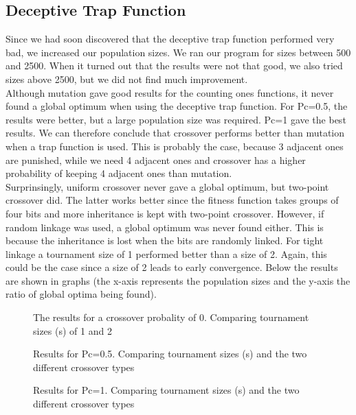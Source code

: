 \documentclass[10pt,a4paper,onecolumn]{article}
\begin{document}
\subsection{Deceptive Trap Function}
Since we had soon discovered that the deceptive trap function performed very bad, we increased our population sizes. We ran our program for sizes between 500 and 2500. When it turned out that the results were not that good, we also tried sizes above 2500, but we did not find much improvement. \\
Although mutation gave good results for the counting ones functions, it never found a global optimum when using the deceptive trap function. For Pc=0.5, the results were better, but a large population size was required. Pc=1 gave the best results. We can therefore conclude that crossover performs better than mutation when a trap function is used. This is probably the case, because 3 adjacent ones are punished, while we need 4 adjacent ones and crossover has a higher probability of keeping 4 adjacent ones than mutation. \\
Surprinsingly, uniform crossover never gave a global optimum, but two-point crossover did. The latter works better since the fitness function takes groups of four bits and more inheritance is kept with two-point crossover. However, if random linkage was used, a global optimum was never found either. This is because the inheritance is lost when the bits are randomly linked. For tight linkage a tournament size of 1 performed better than a size of 2. Again, this could be the case since a size of 2 leads to early convergence. 
Below the results are shown in graphs (the x-axis represents the population sizes and the y-axis the ratio of global optima being found).
\begin{figure}
    \centering
    \caption{The results for a crossover probality of 0. Comparing tournament sizes (s) of 1 and 2}
\end{figure}

\begin{figure}
    \centering
    \caption{Results for Pc=0.5. Comparing tournament sizes (s) and the two different crossover types}
\end{figure}

\begin{figure}
    \centering
    \caption{Results for Pc=1. Comparing tournament sizes (s) and the two different crossover types}
\end{figure}
\end{document}
